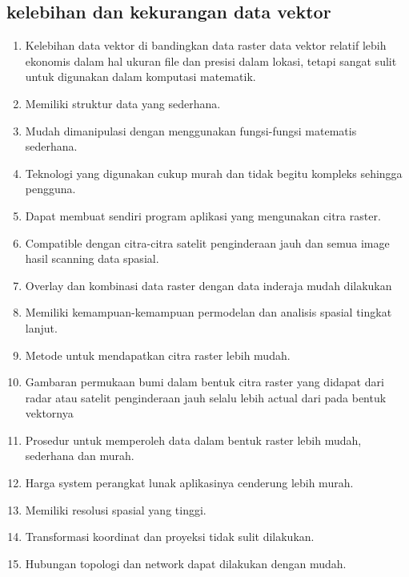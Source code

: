 \subsection{kelebihan dan kekurangan data vektor}
\begin{enumerate}
\item
Kelebihan data vektor di bandingkan data raster
data vektor relatif lebih ekonomis dalam hal ukuran file dan presisi dalam lokasi, tetapi sangat sulit untuk digunakan dalam komputasi matematik. 
\item Memiliki struktur data yang sederhana.
\item Mudah dimanipulasi dengan menggunakan fungsi-fungsi matematis sederhana.
\item Teknologi yang digunakan cukup murah dan tidak begitu kompleks sehingga pengguna.
\item Dapat membuat sendiri program aplikasi yang mengunakan citra raster.
\item Compatible dengan citra-citra satelit penginderaan jauh dan semua image hasil scanning data spasial.
\item Overlay dan kombinasi data raster dengan data inderaja mudah dilakukan
\item Memiliki kemampuan-kemampuan permodelan dan analisis spasial tingkat lanjut.
\item Metode untuk mendapatkan citra raster lebih mudah.
\item Gambaran permukaan bumi dalam bentuk citra raster yang didapat dari radar atau satelit penginderaan jauh selalu lebih actual dari pada bentuk vektornya
\item Prosedur untuk memperoleh data dalam bentuk raster lebih mudah, sederhana dan murah.
\item Harga system perangkat lunak aplikasinya cenderung lebih murah.
\item Memiliki resolusi spasial yang tinggi.
\item Transformasi koordinat dan proyeksi tidak sulit dilakukan.
\item Hubungan topologi dan network dapat dilakukan dengan mudah.


\end{enumerate}
